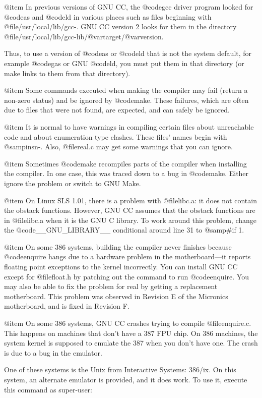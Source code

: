 @item
In previous versions of GNU CC, the @code{gcc} driver program looked for
@code{as} and @code{ld} in various places such as files beginning with
@file{/usr/local/lib/gcc-}.  GNU CC version 2 looks for them in the
directory @file{/usr/local/lib/gcc-lib/@var{target}/@var{version}}.

Thus, to use a version of @code{as} or @code{ld} that is not the system
default, for example @code{gas} or GNU @code{ld}, you must put them in
that directory (or make links to them from that directory).

@item
Some commands executed when making the compiler may fail (return a
non-zero status) and be ignored by @code{make}.  These failures, which
are often due to files that were not found, are expected, and can safely
be ignored.

@item
It is normal to have warnings in compiling certain files about
unreachable code and about enumeration type clashes.  These files' names
begin with @samp{insn-}.  Also, @file{real.c} may get some warnings that
you can ignore.

@item
Sometimes @code{make} recompiles parts of the compiler when installing
the compiler.  In one case, this was traced down to a bug in
@code{make}.  Either ignore the problem or switch to GNU Make.

@item 
On Linux SLS 1.01, there is a problem with @file{libc.a}: it does not
contain the obstack functions.  However, GNU CC assumes that the obstack
functions are in @file{libc.a} when it is the GNU C library.  To work
around this problem, change the @code{__GNU_LIBRARY__} conditional
around line 31 to @samp{#if 1}.

@item
On some 386 systems, building the compiler never finishes because
@code{enquire} hangs due to a hardware problem in the motherboard---it
reports floating point exceptions to the kernel incorrectly.  You can
install GNU CC except for @file{float.h} by patching out the command to
run @code{enquire}.  You may also be able to fix the problem for real by
getting a replacement motherboard.  This problem was observed in
Revision E of the Micronics motherboard, and is fixed in Revision F.

@item
On some 386 systems, GNU CC crashes trying to compile @file{enquire.c}.
This happens on machines that don't have a 387 FPU chip.  On 386
machines, the system kernel is supposed to emulate the 387 when you
don't have one.  The crash is due to a bug in the emulator.

One of these systems is the Unix from Interactive Systems: 386/ix.
On this system, an alternate emulator is provided, and it does work.
To use it, execute this command as super-user:

